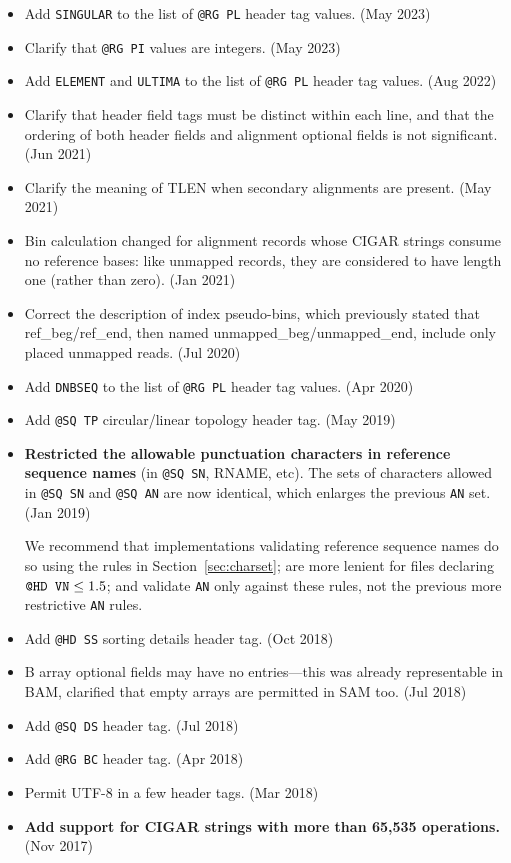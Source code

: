 \documentclass[10pt]{article}
\begin{document}
\begin{appendices}
\begin{itemize}
\item Add {\tt SINGULAR} to the list of {\tt @RG PL} header tag values. (May 2023)
\item Clarify that {\tt @RG PI} values are integers. (May 2023)
\item Add {\tt ELEMENT} and {\tt ULTIMA} to the list of {\tt @RG PL} header tag values. (Aug 2022)
\item Clarify that header field tags must be distinct within each line, and that the ordering of both header fields and alignment optional fields is not significant. (Jun 2021)
\item Clarify the meaning of TLEN when secondary alignments are present. (May 2021)
\item Bin calculation changed for alignment records whose CIGAR strings consume no reference bases: like unmapped records, they are considered to have length one (rather than zero). (Jan 2021)
\item Correct the description of index pseudo-bins, which previously stated that {\sf ref\_beg}/{\sf ref\_end}, then named {\sf unmapped\_beg}/{\sf unmapped\_end}, include only placed unmapped reads. (Jul 2020)
\item Add {\tt DNBSEQ} to the list of {\tt @RG PL} header tag values. (Apr 2020)
\item Add {\tt @SQ TP} circular/linear topology header tag. (May 2019)
\item\textbf{Restricted the allowable punctuation characters in reference sequence names} (in {\tt @SQ SN}, {\sf RNAME}, etc).
The sets of characters allowed in {\tt @SQ SN} and {\tt @SQ AN} are now identical, which enlarges the previous {\tt AN} set. (Jan 2019)

We recommend that implementations validating reference sequence names do so using the rules in Section~\ref{sec:charset}; are more lenient for files declaring $\mbox{\tt @HD VN} \leq 1.5$; and validate {\tt AN} only against these rules, not the previous more restrictive {\tt AN} rules.

\item Add {\tt @HD SS} sorting details header tag. (Oct 2018)
\item B array optional fields may have no entries---this was already representable in BAM, clarified that empty arrays are permitted in SAM too. (Jul 2018)
\item Add {\tt @SQ DS} header tag. (Jul 2018)
\item Add {\tt @RG BC} header tag. (Apr 2018)
\item Permit UTF-8 in a few header tags. (Mar 2018)
\item\textbf{Add support for CIGAR strings with more than 65,535 operations.} (Nov 2017)
\end{itemize}


\end{appendices}
\end{document}
